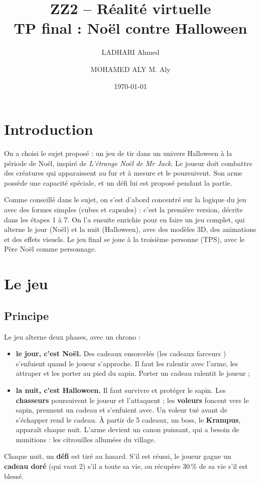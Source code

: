 \documentclass[11pt,a4paper]{article}
\title{ZZ2 -- Réalité virtuelle\\TP final : Noël contre Halloween}
\author{LADHARI Ahmed \and MOHAMED ALY M. Aly}
\date{\today}
\begin{document}
\maketitle
\tableofcontents
\newpage

\section{Introduction}

On a choisi le sujet proposé : un jeu de tir dans un univers Halloween à la période de Noël, inspiré de \emph{L'étrange Noël de Mr Jack}. Le joueur doit combattre des créatures qui apparaissent au fur et à mesure et le poursuivent. Son arme possède une capacité spéciale, et un défi lui est proposé pendant la partie.

Comme conseillé dans le sujet, on s'est d'abord concentré sur la logique du jeu avec des formes simples (cubes et capsules) : c'est la première version, décrite dans les étapes 1 à 7. On l'a ensuite enrichie pour en faire un jeu complet, qui alterne le jour (Noël) et la nuit (Halloween), avec des modèles 3D, des animations et des effets visuels. Le jeu final se joue à la troisième personne (TPS), avec le Père Noël comme personnage.


\section{Le jeu}

\subsection{Principe}
Le jeu alterne deux phases, avec un chrono :
\begin{itemize}
  \item \textbf{le jour, c'est Noël.} Des cadeaux ensorcelés (les \og cadeaux farceurs \fg{}) s'enfuient quand le joueur s'approche. Il faut les ralentir avec l'arme, les attraper et les porter au pied du sapin. Porter un cadeau ralentit le joueur ;
  \item \textbf{la nuit, c'est Halloween.} Il faut survivre et protéger le sapin. Les \textbf{chasseurs} poursuivent le joueur et l'attaquent ; les \textbf{voleurs} foncent vers le sapin, prennent un cadeau et s'enfuient avec. Un voleur tué avant de s'échapper rend le cadeau. À partir de 5 cadeaux, un boss, le \textbf{Krampus}, apparaît chaque nuit. L'arme devient un canon puissant, qui a besoin de munitions : les citrouilles allumées du village.
\end{itemize}
Chaque nuit, un \textbf{défi} est tiré au hasard. S'il est réussi, le joueur gagne un \textbf{cadeau doré} (qui vaut 2) s'il a toute sa vie, ou récupère 30\,\% de sa vie s'il est blessé.
\end{document}
